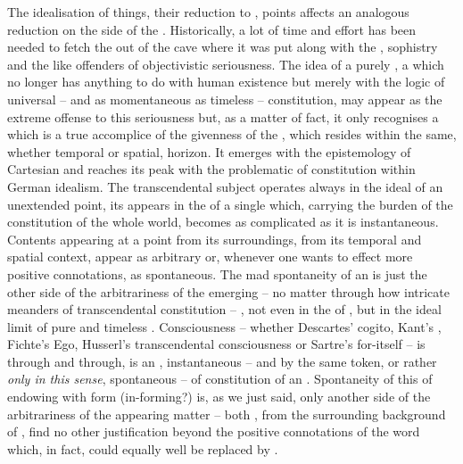 \pa The idealisation of {things}, their reduction to ,
 points affects an analogous reduction on the side of the
. Historically, a lot of time and  effort has been
needed to fetch the  out of the cave where it was put along with the
, sophistry and the like offenders of objectivistic
seriousness.  The idea of a purely , a  which
no longer has anything to do with human existence but merely with the logic of
universal -- and as momentaneous as timeless -- constitution, may appear as the
extreme offense to this seriousness but, as a matter of fact, it only recognises
a  which is a true accomplice of the  givenness of the
, which resides within the same, whether temporal or spatial,
horizon.  It emerges with the epistemology of Cartesian  and reaches
its peak with the problematic of constitution within German idealism.  The
transcendental subject operates always in the ideal  of an
unextended point, its  appears in the  of a single
 which, carrying the burden of the constitution of the whole world,
becomes as complicated as it is instantaneous.  Contents appearing at a point
 from its surroundings, from its temporal and spatial context,
appear as arbitrary or, whenever one wants to effect more positive connotations,
as spontaneous.  The mad spontaneity of an   is just
the other side of the arbitrariness of the  emerging -- no matter
through how intricate meanders of transcendental constitution -- ,
not even in the  of \herenow, but in the ideal limit of pure and
timeless .  Consciousness -- whether Descartes' cogito, Kant's
, Fichte's Ego, Husserl's transcendental consciousness or Sartre's
for-itself -- is  through and through, is an ,
instantaneous -- and by the same token, or rather {\em only in this sense},
spontaneous --  of constitution of an .  Spontaneity of this
 of endowing with form (in-forming?) is, as we just said, only another
side of the arbitrariness of the appearing matter -- both ,
 from the surrounding background of , find no
other justification beyond the positive connotations of the word
 which, in fact, could equally well be replaced by
.


